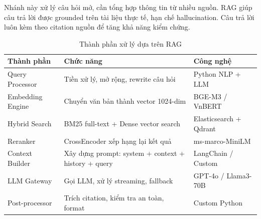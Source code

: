 Nhánh này xử lý câu hỏi mở, cần tổng hợp thông tin từ nhiều nguồn. RAG giúp câu trả lời được grounded trên tài liệu thực tế, hạn chế hallucination. Câu trả lời luôn kèm theo citation nguồn để tăng khả năng kiểm chứng.

\begin{table}[H]
    \centering
    \caption{Thành phần xử lý dựa trên RAG}
    \label{tab:rag_based_components}
    \begin{tabularx}{\textwidth}{|>{\raggedright\arraybackslash}p{}|>{\raggedright\arraybackslash}X|>{\raggedright\arraybackslash}p{}|}
        \hline
        \textbf{Thành phần} & \textbf{Chức năng} & \textbf{Công nghệ} \\
        \hline
        Query Processor & Tiền xử lý, mở rộng, rewrite câu hỏi & Python NLP + LLM \\
        \hline
        Embedding Engine & Chuyển văn bản thành vector 1024-dim & BGE-M3 / VnBERT \\
        \hline
        Hybrid Search & BM25 full-text + Dense vector search & Elasticsearch + Qdrant \\
        \hline
        Reranker & CrossEncoder xếp hạng lại kết quả & ms-marco-MiniLM \\
        \hline
        Context Builder & Xây dựng prompt: system + context + history + query & LangChain / Custom \\
        \hline
        LLM Gateway & Gọi LLM, xử lý streaming, fallback & GPT-4o / Llama3-70B \\
        \hline
        Post-processor & Trích citation, kiểm tra an toàn, format & Custom Python \\
        \hline
    \end{tabularx}
\end{table}
